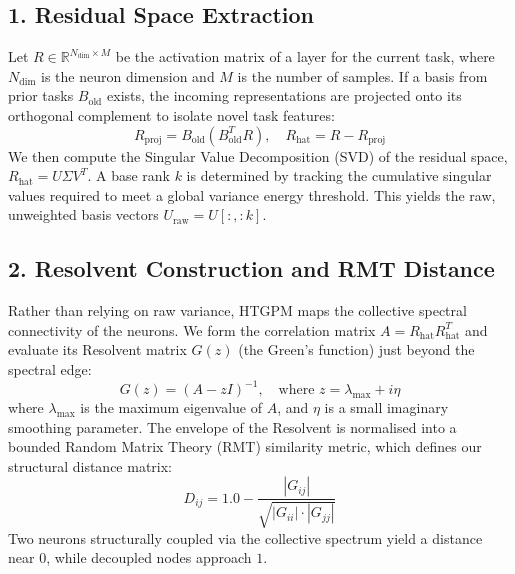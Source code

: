 \documentclass[10pt,a4paper]{article}
\begin{document}
	\subsection{1. Residual Space Extraction}
	Let $R \in \mathbb{R}^{N_{\text{dim}} \times M}$ be the activation matrix of a layer for the current task, where $N_{\text{dim}}$ is the neuron dimension and $M$ is the number of samples. If a basis from prior tasks $B_{\text{old}}$ exists, the incoming representations are projected onto its orthogonal complement to isolate novel task features:
	\begin{equation}
		R_{\text{proj}} = B_{\text{old}} (B_{\text{old}}^T R), \quad R_{\text{hat}} = R - R_{\text{proj}}
	\end{equation}
	We then compute the Singular Value Decomposition (SVD) of the residual space, $R_{\text{hat}} = U \Sigma V^T$. A base rank $k$ is determined by tracking the cumulative singular values required to meet a global variance energy threshold. This yields the raw, unweighted basis vectors $U_{\text{raw}} = U[:, :k]$.
	
	\subsection{2. Resolvent Construction and RMT Distance}
	Rather than relying on raw variance, HTGPM maps the collective spectral connectivity of the neurons. We form the correlation matrix $A = R_{\text{hat}} R_{\text{hat}}^T$ and evaluate its Resolvent matrix $G(z)$ (the Green's function) just beyond the spectral edge:
	\begin{equation}
		G(z) = (A - z I)^{-1}, \quad \text{where } z = \lambda_{\text{max}} + i\eta
	\end{equation}
	where $\lambda_{\text{max}}$ is the maximum eigenvalue of $A$, and $\eta$ is a small imaginary smoothing parameter. The envelope of the Resolvent is normalised into a bounded Random Matrix Theory (RMT) similarity metric, which defines our structural distance matrix:
	\begin{equation}
		D_{ij} = 1.0 - \frac{|G_{ij}|}{\sqrt{|G_{ii}| \cdot |G_{jj}|}}
	\end{equation}
	Two neurons structurally coupled via the collective spectrum yield a distance near $0$, while decoupled nodes approach $1$.
	
\end{document}

